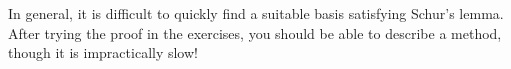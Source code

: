In general, it is difficult to quickly find a suitable basis satisfying Schur's lemma. After trying the proof in the exercises, you should be able to describe a method, though it is impractically slow!






